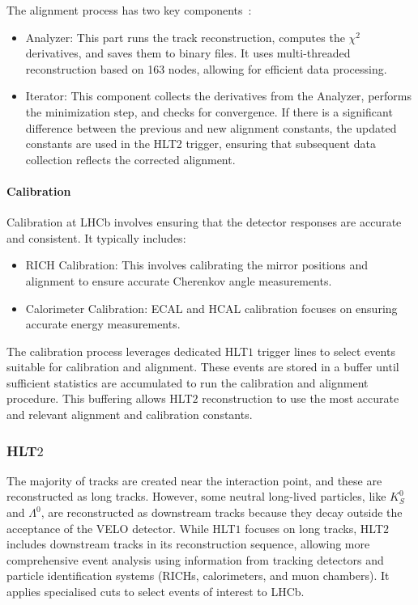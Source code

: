 The alignment process has two key components~\cite{Saur:20230E}:
\begin{itemize}
\item Analyzer: This part runs the track reconstruction, computes the $\chi^2$ derivatives, and saves them to binary files. It uses multi-threaded reconstruction based on 163 nodes, allowing for efficient data processing.
\item Iterator: This component collects the derivatives from the Analyzer, performs the minimization step, and checks for convergence. If there is a significant difference between the previous and new alignment constants, the updated constants are used in the HLT2 trigger, ensuring that subsequent data collection reflects the corrected alignment.
\end{itemize}
\paragraph{Calibration}
Calibration at LHCb involves ensuring that the detector responses are accurate and consistent. It typically includes:
\begin{itemize}
\item RICH Calibration: This involves calibrating the mirror positions and alignment to ensure accurate Cherenkov angle measurements.
\item Calorimeter Calibration: ECAL and HCAL calibration focuses on ensuring accurate energy measurements.
\end{itemize}
The calibration process leverages dedicated HLT$1$ trigger lines to select events suitable for calibration and alignment. These events are stored in a buffer until sufficient statistics are accumulated to run the calibration and alignment procedure. This buffering allows HLT$2$ reconstruction to use the most accurate and relevant alignment and calibration constants.
\subsubsection{HLT$2$}
The majority of tracks are created near the interaction point, and these are reconstructed as long tracks. However, some neutral long-lived particles, like $K^0_S$ and $\Lambda^0$, are reconstructed as downstream tracks because they decay outside the acceptance of the VELO detector. While HLT$1$ focuses on long tracks, HLT$2$ includes downstream tracks in its reconstruction sequence, allowing more comprehensive event analysis using information from tracking detectors and particle identification systems (RICHs, calorimeters, and muon chambers). It applies specialised cuts to select events of interest to LHCb.

